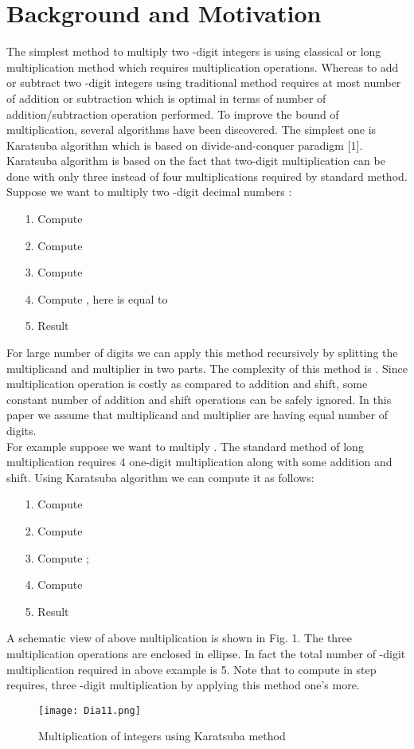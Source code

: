 \documentclass[conference]{IEEEtran}
\begin{document}
\section{Background and Motivation}
The simplest method to multiply two -digit integers is using classical or long multiplication method which requires
 multiplication operations. Whereas to add or subtract two -digit integers using traditional method requires at most  number of addition or subtraction which is optimal in terms of number of addition/subtraction operation performed. To improve the  bound of multiplication, several algorithms have been discovered.  The simplest one is Karatsuba algorithm which is based on divide-and-conquer paradigm [1]. Karatsuba algorithm is based on the fact that two-digit multiplication can be done with only three instead of four multiplications required by standard method. Suppose we want to multiply two -digit decimal numbers  :
\begin{enumerate}
 \item[1.] Compute 
 \item[2.] Compute 
 \item[3.] Compute 
 \item[4.] Compute , here  is equal to 
 \item[5.] Result  
\end{enumerate}
For large number of digits we can apply this method recursively by splitting the multiplicand and multiplier in two parts. The complexity of this method is . Since multiplication operation is costly as compared to addition and shift, some constant number of addition and shift operations can be safely ignored. In this paper we assume that multiplicand and multiplier are having equal number of digits.\\

For example suppose we want to multiply . The standard method of long multiplication requires 4 one-digit multiplication along with some addition and shift. Using Karatsuba algorithm we can compute it as follows:
\begin{enumerate}
 \item[1.] Compute 
 \item[2.] Compute 
 \item[3.] Compute ; 
 \item[4.] Compute  
 \item[5.] Result  
\end{enumerate}
A schematic view of above multiplication is shown in Fig. 1. The three multiplication operations are enclosed in ellipse.  In fact the total number of -digit multiplication required in above example is 5. Note that to compute  in step  requires, three -digit multiplication by applying this method one's more. 
\begin{figure}[ht]
\begin{center}
\texttt{[image: Dia11.png]}
\end{center}
\caption{Multiplication of integers  using Karatsuba method}
\label{graph1}
\end{figure}
\end{document}
